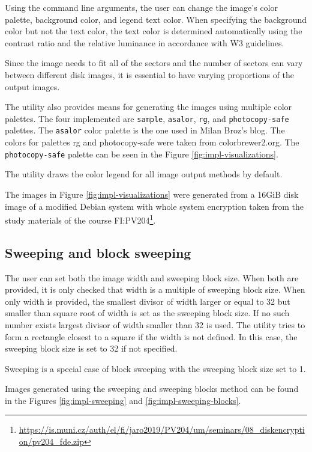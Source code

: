 \documentclass[
  digital, %
  color,   %
  oneside, %
  lof,     %
  nolot,     %
]{fithesis4}
\begin{document}
Using the command line arguments, the user can change the image's color palette, background color, and legend text color.
When specifying the background color but not the text color, the text color is determined automatically using the contrast ratio and the relative luminance in accordance with W3 guidelines.\cite{w3guidelines}

Since the image needs to fit all of the sectors and the number of sectors can vary between different disk images, it is essential to have varying proportions of the output images.

The utility also provides means for generating the images using multiple color palettes.
The four implemented are \texttt{sample}, \texttt{asalor}, \texttt{rg}, and \texttt{photocopy-safe} palettes.
The \texttt{asalor} color palette is the one used in Milan Broz's blog\cite{broz11}.
The colors for palettes rg and photocopy-safe were taken from colorbrewer2.org\cite{brewer02}.
The \texttt{photocopy-safe} palette can be seen in the Figure \ref{fig:impl-visualizations}.

The utility draws the color legend for all image output methods by default.

The images in Figure \ref{fig:impl-visualizations} were generated from a 16GiB disk image of a modified Debian system with whole system encryption taken from the study materials of the course FI:PV204\footnote{\url{https://is.muni.cz/auth/el/fi/jaro2019/PV204/um/seminars/08_diskencryption/pv204_fde.zip}}.

\subsection{Sweeping and block sweeping}
\label{ssec:sweeping-and-block-sweeping}

The user can set both the image width and sweeping block size.
When both are provided, it is only checked that width is a multiple of sweeping block size.
When only width is provided, the smallest divisor of width larger or equal to 32 but smaller than square root of width is set as the sweeping block size.
If no such number exists largest divisor of width smaller than 32 is used.
The utility tries to form a rectangle closest to a square if the width is not defined.
In this case, the sweeping block size is set to 32 if not specified.

Sweeping is a special case of block sweeping with the sweeping block size set to 1.

Images generated using the sweeping and sweeping blocks method can be found in the Figures \ref{fig:impl-sweeping} and \ref{fig:impl-sweeping-blocks}.
\end{document}
